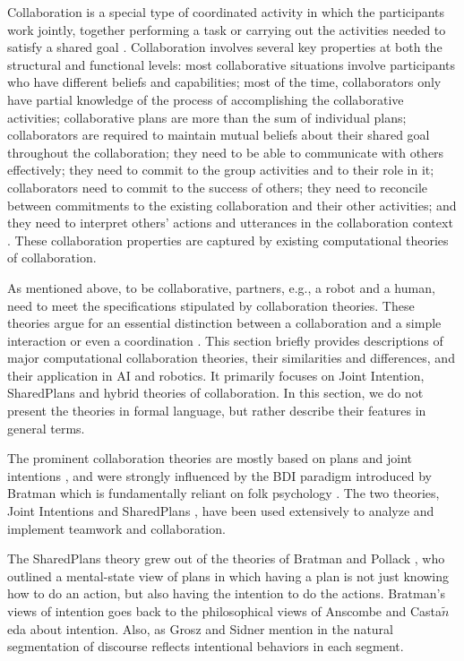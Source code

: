 \documentclass[12pt]{report}
\begin{document}
Collaboration is a special type of coordinated activity in which the
participants work jointly, together performing a task or carrying out the
activities needed to satisfy a shared goal \cite{grosz:collaboration}.
Collaboration involves several key properties at both the structural and
functional levels: most collaborative situations involve participants who have
different beliefs and capabilities; most of the time, collaborators only have
partial knowledge of the process of accomplishing the collaborative activities;
collaborative plans are more than the sum of individual plans; collaborators are
required to maintain mutual beliefs about their shared goal throughout the
collaboration; they need to be able to communicate with others effectively; they
need to commit to the group activities and to their role in it; collaborators
need to commit to the success of others; they need to reconcile between
commitments to the existing collaboration and their other activities; and they
need to interpret others' actions and utterances in the collaboration context
\cite{grosz:mice-menus}. These collaboration properties are captured by existing
computational theories of collaboration.

As mentioned above, to be collaborative, partners, e.g., a robot and a human,
need to meet the specifications stipulated by collaboration theories. These
theories argue for an essential distinction between a collaboration and a simple
interaction or even a coordination \cite{grosz:shared-plans,
lochbaum:collaborative-planning}. This section briefly provides descriptions of
major computational collaboration theories, their similarities and differences,
and their application in AI and robotics. It primarily focuses on Joint
Intention, SharedPlans and hybrid theories of collaboration. In this section, we
do not present the theories in formal language, but rather describe their
features in general terms.

The prominent collaboration theories are mostly based on plans and joint
intentions \cite{cohen:teamwork} \cite{grosz:plans-discourse}
\cite{Litman:discourse-commonsense}, and were strongly influenced by the BDI
paradigm introduced by Bratman \cite{bratman:intentions-plans} which is
fundamentally reliant on folk psychology \cite{ravenscroft:folk}. The two
theories, Joint Intentions \cite{cohen:teamwork} and SharedPlans
\cite{grosz:collaboration,grosz:plans-discourse}, have been used extensively to
analyze and implement teamwork and collaboration.

The SharedPlans theory grew out of the theories of Bratman and Pollack
\cite{bratman:plans-reasoning,pollack:plan-inference,
pollack:plan-mental-attitudes}, who outlined a mental-state view of plans in
which having a plan is not just knowing how to do an action, but also having the
intention to do the actions. Bratman's views of intention goes back to the
philosophical views of Anscombe \cite{anscombe:intention} and
Casta$\tilde{n}$eda \cite{castaneda:thinking} about intention. Also, as Grosz
and Sidner mention in \cite{grosz:plans-discourse} the natural segmentation of
discourse reflects intentional behaviors in each segment.
\end{document}
